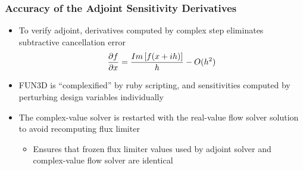 \documentclass{beamer}
\begin{document}
\begin{frame}
  \frametitle{Accuracy of the Adjoint Sensitivity Derivatives}
  \begin{itemize}
    \item To verify adjoint, derivatives computed by complex step eliminates
      subtractive cancellation error
    \[
      \frac{\partial f}{\partial x} = \frac{Im\left[ f(x + ih) \right]}{h} - O(h^2)
    \]
    \item FUN3D is ``complexified'' by ruby scripting, and sensitivities
      computed by perturbing design variables individually
    \item The complex-value solver is restarted with the real-value flow solver
      solution to avoid recomputing flux limiter
      \begin{itemize}
        \item Ensures that frozen flux limiter values used by adjoint
          solver and complex-value flow solver are identical
      \end{itemize}
  \end{itemize}
\end{frame}
\end{document}
